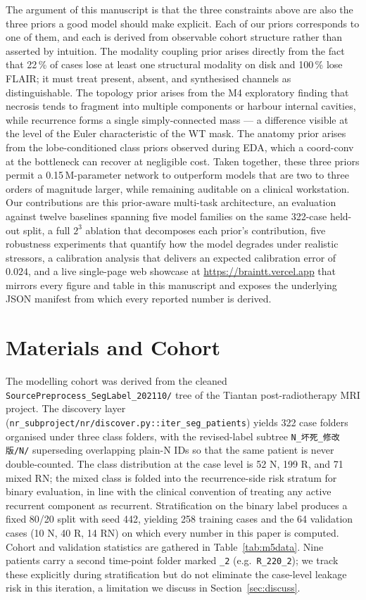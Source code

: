 \documentclass[11pt,a4paper]{article}
\begin{document}
The argument of this manuscript is that the three constraints above are also the three priors a good model should make explicit. Each of our priors corresponds to one of them, and each is derived from observable cohort structure rather than asserted by intuition. The modality coupling prior arises directly from the fact that 22\,\% of cases lose at least one structural modality on disk and 100\,\% lose FLAIR; it must treat present, absent, and synthesised channels as distinguishable. The topology prior arises from the M4 exploratory finding that necrosis tends to fragment into multiple components or harbour internal cavities, while recurrence forms a single simply-connected mass --- a difference visible at the level of the Euler characteristic of the WT mask. The anatomy prior arises from the lobe-conditioned class priors observed during EDA, which a coord-conv at the bottleneck can recover at negligible cost. Taken together, these three priors permit a 0.15\,M-parameter network to outperform models that are two to three orders of magnitude larger, while remaining auditable on a clinical workstation. Our contributions are this prior-aware multi-task architecture, an evaluation against twelve baselines spanning five model families on the same 322-case held-out split, a full $2^3$ ablation that decomposes each prior's contribution, five robustness experiments that quantify how the model degrades under realistic stressors, a calibration analysis that delivers an expected calibration error of $0.024$, and a live single-page web showcase at \url{https://braintt.vercel.app} that mirrors every figure and table in this manuscript and exposes the underlying JSON manifest from which every reported number is derived.

\section{Materials and Cohort}

The modelling cohort was derived from the cleaned \texttt{SourcePreprocess\_SegLabel\_202110/} tree of the Tiantan post-radiotherapy MRI project. The discovery layer (\texttt{nr\_subproject/nr/discover.py::iter\_seg\_patients}) yields 322 case folders organised under three class folders, with the revised-label subtree \texttt{N\_坏死\_修改版/N/} superseding overlapping plain-N IDs so that the same patient is never double-counted. The class distribution at the case level is 52 N, 199 R, and 71 mixed RN; the mixed class is folded into the recurrence-side risk stratum for binary evaluation, in line with the clinical convention of treating any active recurrent component as recurrent. Stratification on the binary label produces a fixed 80/20 split with seed 442, yielding 258 training cases and the 64 validation cases (10 N, 40 R, 14 RN) on which every number in this paper is computed. Cohort and validation statistics are gathered in Table~\ref{tab:m5data}. Nine patients carry a second time-point folder marked \texttt{\_2} (e.g.\ \texttt{R\_220\_2}); we track these explicitly during stratification but do not eliminate the case-level leakage risk in this iteration, a limitation we discuss in Section~\ref{sec:discuss}.
\end{document}
